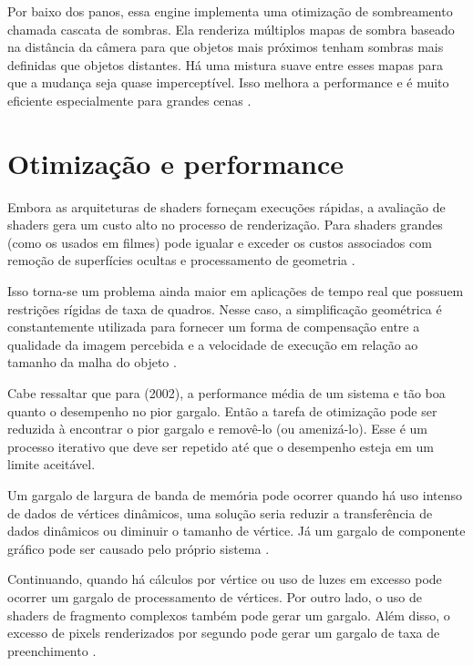 Por baixo dos panos, essa engine implementa uma otimização de sombreamento chamada cascata de sombras. Ela renderiza múltiplos mapas de sombra baseado na distância da câmera para que objetos mais próximos tenham sombras mais definidas que objetos distantes. Há uma mistura suave entre esses mapas para que a mudança seja quase imperceptível. Isso melhora a performance e é muito eficiente especialmente para grandes cenas \cite{vsmid2017comparison}. 

\section{Otimização e performance}
\label{sec:otimizacao-performance}

Embora as arquiteturas de shaders forneçam execuções rápidas, a avaliação de shaders gera um custo alto no processo de renderização. Para shaders grandes (como os usados em filmes) pode igualar e exceder os custos associados com remoção de superfícies ocultas e processamento de geometria \cite{fabio2005user}. 

Isso torna-se um problema ainda maior em aplicações de tempo real que possuem restrições rígidas de taxa de quadros. Nesse caso, a simplificação geométrica é constantemente utilizada para fornecer um forma de compensação entre a qualidade da imagem percebida e a velocidade de execução em relação ao tamanho da malha do objeto \cite{fabio2005user}.

Cabe ressaltar que para  (2002), a performance média de um sistema e tão boa quanto o desempenho no pior gargalo. Então a tarefa de otimização pode ser reduzida à encontrar o pior gargalo e removê-lo (ou amenizá-lo). Esse é um processo iterativo que deve ser repetido até que o desempenho esteja em um limite aceitável.

Um gargalo de largura de banda de memória pode ocorrer quando há uso intenso de dados de vértices dinâmicos, uma solução seria reduzir a transferência de dados dinâmicos ou diminuir o tamanho de vértice. Já um gargalo de componente gráfico pode ser causado pelo próprio sistema \cite{riguer2002performance}.

Continuando, quando há cálculos por vértice ou uso de luzes em excesso pode ocorrer um gargalo de processamento de vértices. Por outro lado, o uso de shaders de fragmento complexos também pode gerar um gargalo. Além disso, o excesso de pixels renderizados por segundo pode gerar um gargalo de taxa de preenchimento \cite{riguer2002performance}.

